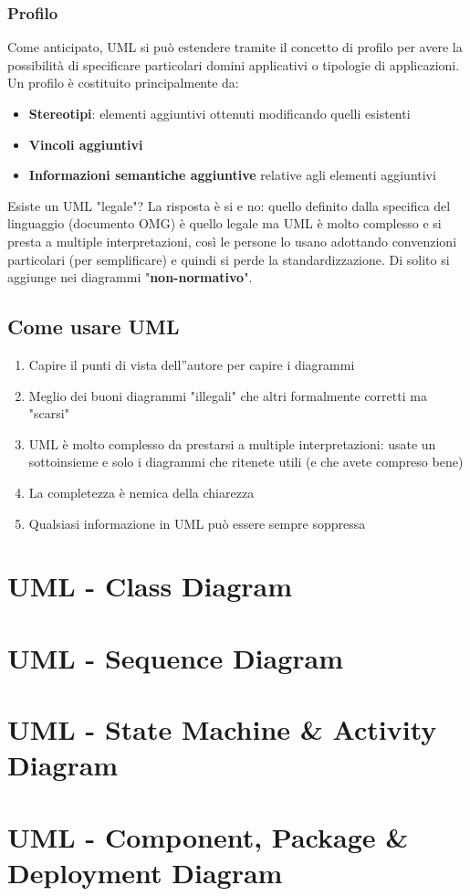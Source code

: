 \documentclass[12pt, a4paper]{report}
\begin{document}
\subsection{Profilo}
Come anticipato, UML si può estendere tramite il concetto di profilo per avere la possibilità di specificare particolari domini applicativi o tipologie di applicazioni.\\
Un profilo è costituito principalmente da:
\begin{itemize}
    \item \textbf{Stereotipi}: elementi aggiuntivi ottenuti modificando quelli esistenti
    \item \textbf{Vincoli aggiuntivi}
    \item \textbf{Informazioni semantiche aggiuntive} relative agli elementi aggiuntivi
\end{itemize}
Esiste un UML "legale"? La risposta è si e no: quello definito dalla specifica del  linguaggio (documento OMG) è quello legale ma UML è molto complesso e si presta a multiple interpretazioni, così le persone lo usano adottando convenzioni particolari (per semplificare) e quindi si perde la standardizzazione. Di solito si aggiunge nei diagrammi "\textbf{non-normativo}".
\section{Come usare UML}
\begin{enumerate}
    \item Capire il punti di vista dell''autore per capire i diagrammi
    \item Meglio dei buoni diagrammi "illegali" che altri formalmente corretti ma "scarsi"
    \item UML è molto complesso da prestarsi a multiple interpretazioni: usate un sottoinsieme e solo i diagrammi che ritenete utili (e che avete compreso bene)
    \item La completezza è nemica della chiarezza
    \item Qualsiasi informazione in UML può essere sempre soppressa
\end{enumerate}
\chapter{UML - Class Diagram}
\chapter{UML - Sequence Diagram}
\chapter{UML - State Machine \& Activity Diagram}
\chapter{UML - Component, Package \& Deployment Diagram}
\end{document}

